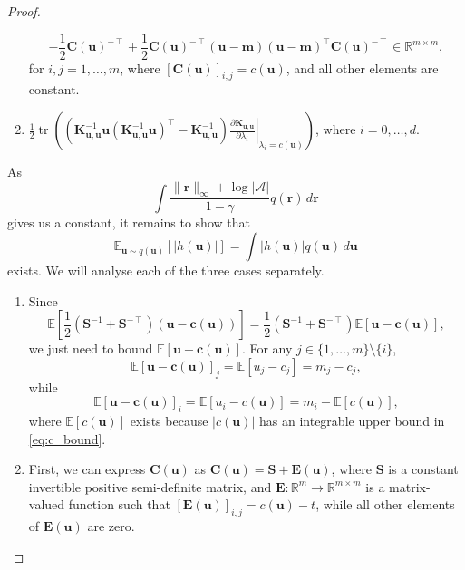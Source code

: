 \documentclass{article}
\theoremstyle{definition}
\DeclareMathOperator{\tr}{tr}
\newcommand{\Kuu}{\mathbf{K}_{\mathbf{u},\mathbf{u}}}
\newcommand{\rinf}{\lVert \mathbf{r} \rVert_\infty}
\newcommand{\vbound}{\frac{\rinf + \log|\mathcal{A}|}{1 - \gamma}}
\begin{document}
\begin{proof}
\begin{enumerate}
    \[
      -\frac{1}{2}\mathbf{C}(\mathbf{u})^{-\intercal} +
      \frac{1}{2}\mathbf{C}(\mathbf{u})^{-\intercal}(\mathbf{u} -
      \mathbf{m})(\mathbf{u} -
      \mathbf{m})^\intercal\mathbf{C}(\mathbf{u})^{-\intercal} \in \mathbb{R}^{m
        \times m},
    \]
    for $i, j = 1, \dots, m$, where $[\mathbf{C}(\mathbf{u})]_{i,j} =
    c(\mathbf{u})$, and all other elements are constant.
  \item $\frac{1}{2}\tr
    \left((\Kuu^{-1}\mathbf{u}(\Kuu^{-1}\mathbf{u})^\intercal - \Kuu^{-1})
      \left. \frac{\partial \Kuu}{\partial \lambda_i} \right|_{\lambda_i = c(\mathbf{u})}
    \right)$, where $i = 0, \dots, d$.
  \end{enumerate} %

  As
  \[ \int \vbound q(\mathbf{r})\,d\mathbf{r} \]
  gives us a constant, it remains to show that
  \[ \mathbb{E}_{\mathbf{u} \sim q(\mathbf{u})}[|h(\mathbf{u})|] = \int
    |h(\mathbf{u})| q(\mathbf{u}) \,d\mathbf{u} \]
  exists. We will analyse each of the three cases separately.
  \begin{enumerate}
  \item Since
    \[ \mathbb{E} \left[ \frac{1}{2}(\mathbf{S}^{-1} +
        \mathbf{S}^{-\intercal})(\mathbf{u} - \mathbf{c}(\mathbf{u})) \right] =
      \frac{1}{2}(\mathbf{S}^{-1} + \mathbf{S}^{-\intercal})
      \mathbb{E}[\mathbf{u} - \mathbf{c}(\mathbf{u})], \]
    we just need to bound $\mathbb{E}[\mathbf{u} - \mathbf{c}(\mathbf{u})]$. For
    any $j \in \{ 1, \dots, m \} \setminus \{ i \}$,
    \[ \mathbb{E}[\mathbf{u} - \mathbf{c}(\mathbf{u})]_j = \mathbb{E}[u_j - c_j]
      = m_j - c_j, \]
    while
    \[ \mathbb{E}[\mathbf{u} - \mathbf{c}(\mathbf{u})]_i = \mathbb{E}[u_i
      - c(\mathbf{u})] = m_i - \mathbb{E}[c(\mathbf{u})], \]
    where $\mathbb{E}[c(\mathbf{u})]$ exists because $|c(\mathbf{u})|$ has an
    integrable upper bound in \eqref{eq:c_bound}. %
  \item First, we can express $\mathbf{C}(\mathbf{u})$ as
    $\mathbf{C}(\mathbf{u}) = \mathbf{S} + \mathbf{E}(\mathbf{u})$, where
    $\mathbf{S}$ is a constant invertible positive semi-definite matrix, and
    $\mathbf{E} : \mathbb{R}^m \to \mathbb{R}^{m \times m}$ is a matrix-valued
    function such that $[\mathbf{E}(\mathbf{u})]_{i,j} = c(\mathbf{u}) -
    t$, while all other elements of $\mathbf{E}(\mathbf{u})$ are zero.


\end{enumerate}
\end{proof}
\end{document}
